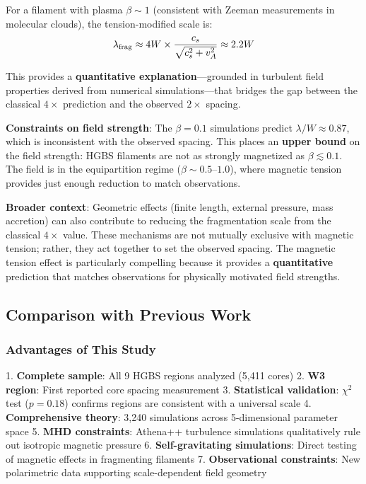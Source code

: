 \documentclass[11pt,a4paper]{article}
\begin{document}
For a filament with plasma $\beta \sim 1$ (consistent with Zeeman measurements in molecular clouds), the tension-modified scale is:
\begin{equation}
\lambda_{\rm frag} \approx 4W \times \frac{c_s}{\sqrt{c_s^2 + v_A^2}} \approx 2.2W
\label{eq:tension2}
\end{equation}

This provides a \textbf{quantitative explanation}—grounded in turbulent field properties derived from numerical simulations—that bridges the gap between the classical $4\times$ prediction and the observed $2\times$ spacing.

\textbf{Constraints on field strength}: The $\beta = 0.1$ simulations predict $\lambda/W \approx 0.87$, which is inconsistent with the observed spacing. This places an \textbf{upper bound} on the field strength: HGBS filaments are not as strongly magnetized as $\beta \lesssim 0.1$. The field is in the equipartition regime ($\beta \sim 0.5$--$1.0$), where magnetic tension provides just enough reduction to match observations.

\textbf{Broader context}: Geometric effects (finite length, external pressure, mass accretion) can also contribute to reducing the fragmentation scale from the classical $4\times$ value. These mechanisms are not mutually exclusive with magnetic tension; rather, they act together to set the observed spacing. The magnetic tension effect is particularly compelling because it provides a \textbf{quantitative} prediction that matches observations for physically motivated field strengths.

\subsection{Comparison with Previous Work}

\subsubsection{Advantages of This Study}

1. \textbf{Complete sample}: All 9 HGBS regions analyzed (5,411 cores)
2. \textbf{W3 region}: First reported core spacing measurement
3. \textbf{Statistical validation}: $\chi^2$ test ($p=0.18$) confirms regions are consistent with a universal scale
4. \textbf{Comprehensive theory}: 3,240 simulations across 5-dimensional parameter space
5. \textbf{MHD constraints}: Athena++ turbulence simulations qualitatively rule out isotropic magnetic pressure
6. \textbf{Self-gravitating simulations}: Direct testing of magnetic effects in fragmenting filaments
7. \textbf{Observational constraints}: New polarimetric data supporting scale-dependent field geometry
\end{document}
